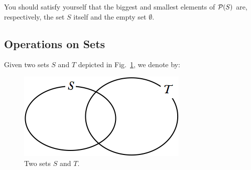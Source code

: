 \noindent
You should satisfy yourself that the biggest and smallest elements of
${\cal P}(S)$ are, respectively, the set $S$ itself and the empty set
$\emptyset$.

\subsection{Operations on Sets}
\label{sec:operations-on-sets}

Given two sets $S$ and $T$ depicted in Fig.~\ref{fig:setInitial}, we denote by:
\begin{figure}[htb]
\begin{center}
        \includegraphics[scale=0.4]{FiguresMaths/setInitial}
        \caption{Two sets $S$ and $T$.}
        \label{fig:setInitial}
\end{center}
\end{figure}

